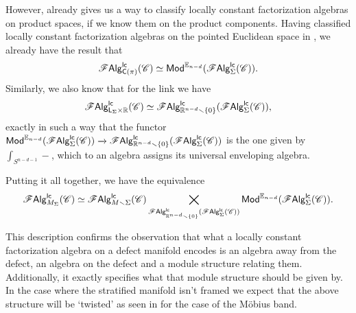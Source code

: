 \documentclass[../text]{subfiles}
\begin{document}
However,  already gives us a way to classify locally constant factorization algebras on product spaces, if we know them on the product components. Having classified locally constant factorization algebras on the pointed Euclidean space in , we already have the result that
%
\begin{equation}
    \lcfa_{\cone(\pi)} (\catC) \simeq \mathsf{Mod}^{\mathbb{E}_{n-d}} (\lcfa_{\Sigma} (\catC)).
\end{equation}
%
Similarly, we also know that for the link we have
%
%
\begin{equation}
    \mathscr{F} \mathsf{Alg}^{\mathsf{lc}}_{\mathsf{L}_{\Sigma} \times \mathbb{R}} (\mathscr{C}) \simeq \mathscr{F} \mathsf{Alg}^{\mathsf{lc}}_{\mathbb{R}^{n-d} \smallsetminus \{ 0\} } (\mathscr{F} \mathsf{Alg}^{\mathsf{lc}}_{\Sigma} (\mathscr{C})),
\end{equation}
%
exactly in such a way that the functor $\mathsf{Mod}^{\mathbb{E}_{n-d}} (\mathscr{F} \mathsf{Alg}^{\mathsf{lc}}_{\Sigma} (\mathscr{C})) \xrightarrow{} \mathscr{F} \mathsf{Alg}^{\mathsf{lc}}_{\mathbb{R}^{n-d} \smallsetminus \{ 0\} } (\mathscr{F} \mathsf{Alg}^{\mathsf{lc}}_{\Sigma} (\mathscr{C}))$ is the one given by $\int_{S^{n-d-1}} -$, which to an algebra assigns its universal enveloping algebra.

Putting it all together, we have the equivalence
%
\begin{equation}
    \mathscr{F} \mathsf{Alg}^{\mathsf{lc}}_{M_\Sigma} (\mathscr{C}) \simeq \mathscr{F} \mathsf{Alg}^{\mathsf{lc}}_{M \smallsetminus \Sigma} (\mathscr{C}) \bigtimes_{\mathscr{F} \mathsf{Alg}^{\mathsf{lc}}_{\mathbb{R}^{n-d} \smallsetminus \{0\}} (\mathscr{F} \mathsf{Alg}^{\mathsf{lc}}_{\Sigma} (\mathscr{C}))} \mathsf{Mod}^{\mathbb{E}_{n-d}} (\mathscr{F} \mathsf{Alg}^{\mathsf{lc}}_{\Sigma} (\mathscr{C})).
\end{equation}

This description confirms the observation that what a locally constant factorization algebra on a defect manifold encodes is an algebra away from the defect, an algebra on the defect and a module structure relating them. Additionally, it exactly specifies what that module structure should be given by. In the case where the stratified manifold isn't framed we expect that the above structure will be `twisted' as seen in  for the case of the M\"obius band.
\end{document}
